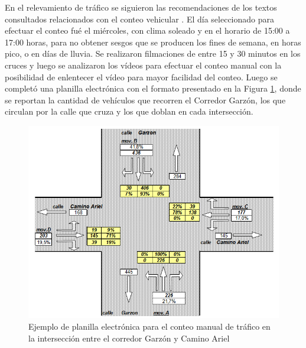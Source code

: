 En el relevamiento de tráfico se siguieron las recomendaciones de los textos consultados relacionados con el conteo vehicular \citep{ConteoTrafico}. El día seleccionado para efectuar el conteo fué el miércoles, con clima soleado y en el horario de 15:00 a 17:00 horas, para no obtener sesgos que se producen los fines de semana, en horas pico, o en días de lluvia. Se realizaron filmaciones de entre 15 y 30 minutos en los cruces y luego se analizaron los vídeos para efectuar el conteo manual con la posibilidad de enlentecer el vídeo para mayor facilidad del conteo. Luego se completó una planilla electrónica con el formato presentado en la Figura \ref{fig:conteo_hoja}, donde se reportan la cantidad de vehículos que recorren el Corredor Garzón, los que circulan por la calle que cruza y los que doblan en cada intersección. 

\begin{figure}[ht]
	\centering
	\includegraphics[width=0.9\linewidth]{Figures/conteo_hoja}
	\caption[Ejemplo de planilla electrónica para el conteo manual de tráfico.]{Ejemplo de planilla electrónica para el conteo manual de tráfico en la intersección entre el corredor Garzón y Camino Ariel}
	\label{fig:conteo_hoja}
\end{figure}



